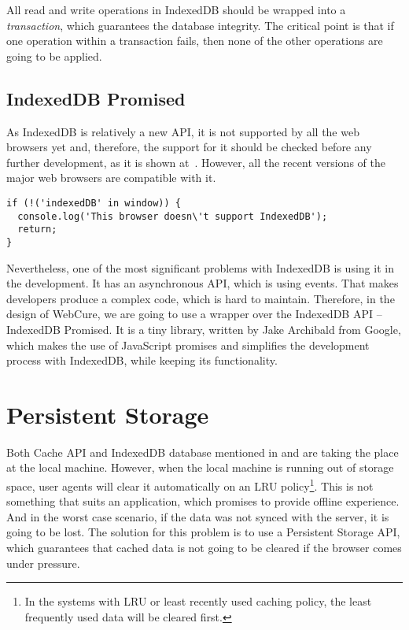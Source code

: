 All read and write operations in IndexedDB should be wrapped into a \textit{transaction}, which guarantees the database integrity. The critical point is that if one operation within a transaction fails, then none of the other operations are going to be applied. 

\subsection{IndexedDB Promised}

As IndexedDB is relatively a new API, it is not supported by all the web browsers yet and, therefore, the support for it should be checked before any further development, as it is shown at~. However, all the recent versions of the major web browsers are compatible with it. 

\begin{lstlisting}[caption={[Code for checking the support of IndexedDB API]Code, which demonstrates how one can check the support for IndexedDB API\cite{35}.}, label={lst:tech7}]
if (!('indexedDB' in window)) {
  console.log('This browser doesn\'t support IndexedDB');
  return;
}
\end{lstlisting}

Nevertheless, one of the most significant problems with IndexedDB is using it in the development. It has an asynchronous API, which is using events. That makes developers produce a complex code, which is hard to maintain. Therefore, in the design of WebCure, we are going to use a wrapper over the IndexedDB API -- IndexedDB Promised\cite{36, 48}. It is a tiny library, written by Jake Archibald from Google, which makes the use of JavaScript promises and simplifies the development process with IndexedDB, while keeping its functionality.

\section{Persistent Storage}
\label{persistentstorage}

Both Cache API and IndexedDB database mentioned in  and  are taking the place at the local machine. However, when the local machine is running out of storage space, user agents will clear it automatically on an LRU policy\footnote{In the systems with LRU or least recently used caching policy, the least frequently used data will be cleared first.}\cite{47}. This is not something that suits an application, which promises to provide offline experience. And in the worst case scenario, if the data was not synced with the server, it is going to be lost. The solution for this problem is to use a Persistent Storage API\cite{45, 46}, which guarantees that cached data is not going to be cleared if the browser comes under pressure.

